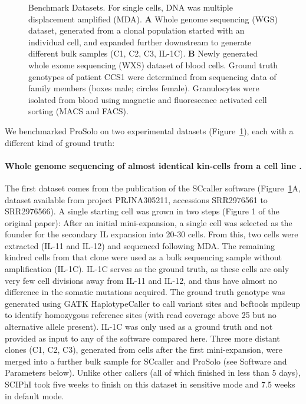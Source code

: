 \documentclass[fleqn,12pt,inline]{wlscirep}
\begin{document}
\begin{figure}[!tpb]
\begin{minipage}{.22\linewidth}
  \end{minipage}
  \caption{
   Benchmark Datasets.
   For single cells, DNA was multiple displacement amplified (MDA).
   \textbf{A} Whole genome sequencing (WGS) dataset, generated from a clonal population started with an individual cell\cite{dong_accurate_2017}, and expanded further downstream to generate different bulk samples (C1, C2, C3, IL-1C).
   \textbf{B} Newly generated whole exome sequencing (WXS) dataset of blood cells.
   Ground truth genotypes of patient CCS1 were determined from sequencing data of family members (boxes male; circles female).
   Granulocytes were isolated from blood using magnetic and fluorescence activated cell sorting (MACS and FACS).
   }
  \label{fig:datasets}
\end{figure}

We benchmarked ProSolo on two experimental datasets (Figure~\ref{fig:datasets}), each with a different kind of ground truth:\\

\paragraph{Whole genome sequencing of almost identical kin-cells from a cell line \cite{dong_accurate_2017}.}
The first dataset comes from the publication of the SCcaller software\cite{dong_accurate_2017} (Figure~\ref{fig:datasets}A, dataset available from project \mbox{PRJNA305211}, accessions \mbox{SRR2976561} to \mbox{SRR2976566}).
A single starting cell was grown in two steps (Figure 1 of the original paper\cite{dong_accurate_2017}):
After an initial mini-expansion, a single cell was selected as the founder for the secondary IL expansion into 20-30 cells.
From this, two cells were extracted (IL-11 and IL-12) and sequenced following MDA.
The remaining kindred cells from that clone were used as a bulk sequencing sample without amplification (IL-1C).
IL-1C serves as the ground truth, as these cells are only very few cell divisions away from IL-11 and IL-12, and thus have almost no difference in the somatic mutations acquired.
The ground truth genotype was generated using GATK HaplotypeCaller to call variant sites and bcftools mpileup to identify homozygous reference sites (with read coverage above 25 but no alternative allele present).
IL-1C was only used as a ground truth and not provided as input to any of the software compared here.
Three more distant clones (C1, C2, C3), generated from cells after the first mini-expansion, were merged into a further bulk sample for SCcaller and ProSolo (see Software and Parameters below).
Unlike other callers (all of which finished in less than 5 days), SCIPhI took five weeks to finish on this dataset in sensitive mode and 7.5 weeks in default mode.\\
\end{document}
